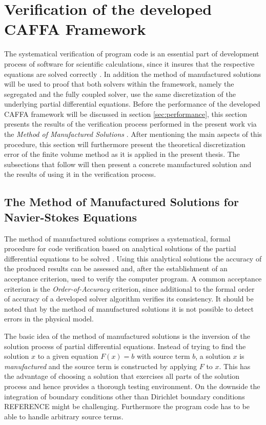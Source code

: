 \section{Verification of the developed CAFFA Framework}

The systematical verification of program code is an essential part of development process of software for scientific calculations, since it insures that the respective equations are solved correctly \cite{oberkampf02}. In addition the method of manufactured solutions will be used to proof that both solvers within the framework, namely the segregated and the fully coupled solver, use the same discretization of the underlying partial differential equations. Before the performance of the developed CAFFA framework will be discussed in section \ref{sec:performance}, this section presents the results of the verification process performed in the present work via the \emph{Method of Manufactured Solutions} \cite{salari00}. After mentioning the main aspects of this procedure, this section will furthermore present the theoretical discretization error of the finite volume method as it is applied in the present thesis. The subsections that follow will then present a concrete manufactured solution and the results of using it in the verification process.

\subsection{The Method of Manufactured Solutions for Navier-Stokes Equations}

The method of manufactured solutions comprises a systematical, formal procedure for code verification based on analytical solutions of the partial differential equations to be solved \cite{salari00}. Using this analytical solutions the accuracy of the produced results can be assessed and, after the establishment of an acceptance criterion, used to verify the computer program. A common acceptance criterion is the \emph{Order-of-Accuracy} criterion, since additional to the formal order of accuracy of a developed solver algorithm verifies its consistency. It should be noted that by the method of manufactured solutions it is not possible to detect errors in the physical model.

The basic idea of the method of manufactured solutions is the inversion of the solution process of partial differential equations. Instead of trying to find the solution \(x\) to a given equation \(F(x) = b\) with source term \(b\), a solution \(x\) is \emph{manufactured} and the source term is constructed by applying \(F\) to \(x\). This has the advantage of choosing a solution that exercises all parts of the solution process and hence provides a thorough testing environment. On the downside the integration of boundary conditions other than Dirichlet boundary conditions REFERENCE might be challenging. Furthermore the program code has to be able to handle arbitrary source terms. 

